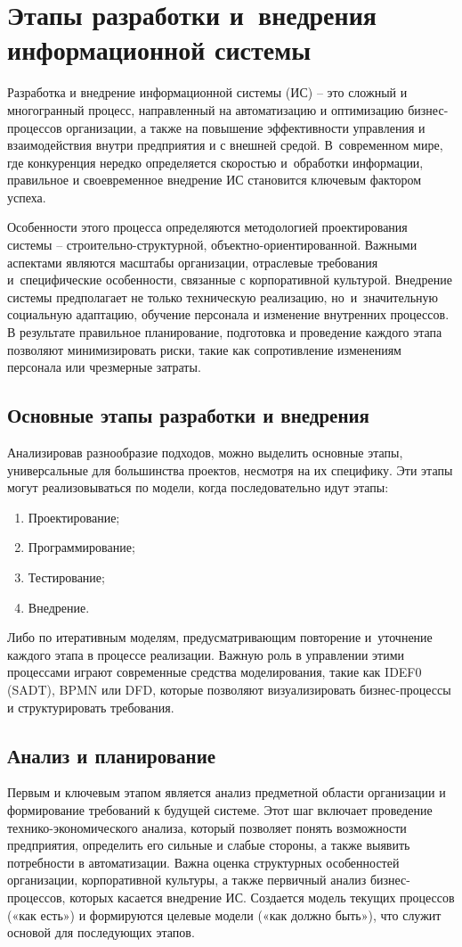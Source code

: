 \documentclass{ou}
\begin{document}
\section{Этапы разработки и~внедрения информационной системы}
Разработка и внедрение информационной системы (ИС) -- это сложный и многогранный процесс, направленный на автоматизацию и оптимизацию бизнес-процессов организации, а также на повышение эффективности управления и взаимодействия внутри предприятия и с внешней средой. В~современном мире, где конкуренция нередко определяется скоростью и~обработки информации, правильное и своевременное внедрение ИС становится ключевым фактором успеха.

Особенности этого процесса определяются методологией проектирования системы -- строительно-структурной, объектно-ориентированной. Важными аспектами являются масштабы организации, отраслевые требования и~специфические особенности, связанные с корпоративной культурой. Внедрение системы предполагает не только техническую реализацию, но~и~значительную социальную адаптацию, обучение персонала и изменение внутренних процессов. В результате правильное планирование, подготовка и проведение каждого этапа позволяют минимизировать риски, такие как сопротивление изменениям персонала или чрезмерные затраты.
\subsection{Основные этапы разработки и внедрения}
Анализировав разнообразие подходов, можно выделить основные этапы, универсальные для большинства проектов, несмотря на их специфику. Эти этапы могут реализовываться по модели, когда последовательно идут этапы:
\begin{enumerate}[leftmargin=0em, itemindent=3.75em, nosep, label=\arabic*)]
\item Проектирование;
\item Программирование;
\item Тестирование;
\item Внедрение.
\end{enumerate}

Либо по итеративным моделям, предусматривающим повторение и~уточнение каждого этапа в процессе реализации. Важную роль в управлении этими процессами играют современные средства моделирования, такие как IDEF0 (SADT), BPMN или DFD, которые позволяют визуализировать бизнес-процессы и структурировать требования.
\subsection{Анализ и планирование}
Первым и ключевым этапом является анализ предметной области организации и формирование требований к будущей системе. Этот шаг включает проведение технико-экономического анализа, который позволяет понять возможности предприятия, определить его сильные и слабые стороны, а также выявить потребности в автоматизации. Важна оценка структурных особенностей организации, корпоративной культуры, а также первичный анализ бизнес-процессов, которых касается внедрение ИС. Создается модель текущих процессов («как есть») и формируются целевые модели («как должно быть»), что служит основой для последующих этапов.
\end{document}
